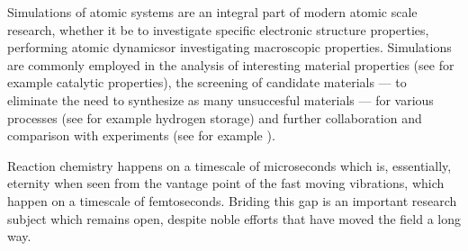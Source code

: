 Simulations of atomic systems are an integral part of modern atomic scale research, whether it be to investigate specific electronic structure properties\citemiss, performing atomic dynamics\citemiss or investigating macroscopic properties\citemiss.
Simulations are commonly employed in the analysis of interesting material properties (see for example catalytic properties\citemiss), the screening of candidate materials --- to eliminate the need to synthesize as many unsuccesful materials --- for various processes (see for example hydrogen storage\citemiss) and further collaboration and comparison with experiments (see for example \citemiss).

Reaction chemistry happens on a timescale of microseconds which is, essentially, eternity when seen from the vantage point of the fast moving vibrations, which happen on a timescale of femtoseconds.
Briding this gap is an important research subject which remains open, despite noble efforts that have moved the field a long way\citemiss.



\incomplete
